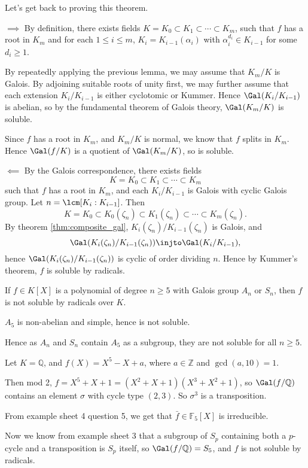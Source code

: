 \documentclass[12pt]{article}
\begin{document}
Let's get back to proving this theorem.

\begin{proofbox}
	$\implies$ By definition, there exists fields $K = K_0 \subset K_1 \subset \cdots \subset K_m$, such that $f$ has a root in $K_m$ and for each $1 \leq i \leq m$, $K_i = K_{i-1}(\alpha_i)$ with $\alpha_i^{d_i} \in K_{i-1}$ for some $d_i \geq 1$.

	By repeatedly applying the previous lemma, we may assume that $K_m / K$ is Galois. By adjoining suitable roots of unity first, we may further assume that each extension $K_i/K_{i-1}$ is either cyclotomic or Kummer. Hence $\Gal(K_i/K_{i-1})$ is abelian, so by the fundamental theorem of Galois theory, $\Gal(K_m/K)$ is soluble.

	Since $f$ has a root in $K_m$, and $K_m/K$ is normal, we know that $f$ splits in $K_m$. Hence $\Gal(f/K)$ is a quotient of $\Gal(K_m/K)$, so is soluble.

	$\impliedby$ By the Galois correspondence, there exists fields
	\[
	K = K_0 \subset K_1 \subset \cdots \subset K_m
	\]
	such that $f$ has a root in $K_m$, and each $K_i/K_{i-1}$ is Galois with cyclic Galois group. Let $n = \lcm [K_i:K_{i-1}]$. Then
	\[
	K = K_0 \subset K_0(\zeta_n) \subset K_1(\zeta_n) \subset \cdots \subset K_m(\zeta_n).
	\]
	By theorem \ref{thm:composite_gal}, $K_i(\zeta_n) / K_{i-1}(\zeta_n)$ is Galois, and
	\[
	\Gal(K_i(\zeta_n)/K_{i-1}(\zeta_n)) \injto \Gal(K_i/K_{i-1}),
	\]
	hence $\Gal(K_i(\zeta_n)/K_{i-1}(\zeta_n))$ is cyclic of order dividing $n$. Hence by Kummer's theorem, $f$ is soluble by radicals.
\end{proofbox}

\begin{corollary}
	If $f \in K[X]$ is a polynomial of degree $n \geq 5$ with Galois group $A_n$ or $S_n$, then $f$ is not soluble by radicals over $K$.
\end{corollary}

\begin{proofbox}
	$A_5$ is non-abelian and simple, hence is not soluble.

	Hence as $A_n$ and $S_n$ contain $A_5$ as a subgroup, they are not soluble for all $n \geq 5$.
\end{proofbox}

\begin{exbox}
	Let $K = \mathbb{Q}$, and $f(X) = X^5 - X + a$, where $a \in \mathbb{Z}$ and $\gcd(a, 10) = 1$.

	Then mod 2, $f = X^5 + X + 1 = (X^2 + X + 1)(X^3 + X^2 + 1)$, so $\Gal(f/\mathbb{Q})$ contains an element $\sigma$ with cycle type $(2, 3)$. So $\sigma^3$ is a transposition.

	From example sheet 4 question 5, we get that $\bar f \in \mathbb{F}_5[X]$ is irreducible.

	Now we know from example sheet 3 that a subgroup of $S_p$ containing both a $p$-cycle and a transposition is $S_p$ itself, so $\Gal(f/\mathbb{Q}) = S_5$, and $f$ is not soluble by radicals.
\end{exbox}
\end{document}
